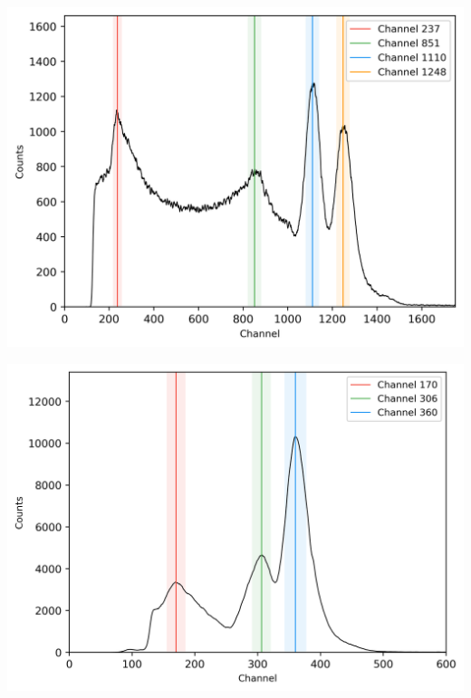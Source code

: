 %
\begin{center}
    \begin{adjustbox}{max width=\linewidth, keepaspectratio}
        \includegraphics[]{png/60Co}
    \end{adjustbox}
    \label{fig:}
\end{center}
%
\begin{center}
    \begin{adjustbox}{max width=\linewidth, keepaspectratio}
        \includegraphics[]{png/133Ba}
    \end{adjustbox}
    \label{fig:}
\end{center}
%

